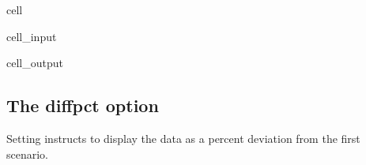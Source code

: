\documentclass[letterpaper,10pt,english]{jupyterBook}
\begin{document}
\begin{sphinxuseclass}{cell}\begin{sphinxVerbatimInput}

\begin{sphinxuseclass}{cell_input}
\begin{sphinxVerbatim}[commandchars=\\\{\}]
  
\end{sphinxVerbatim}

\end{sphinxuseclass}\end{sphinxVerbatimInput}
\begin{sphinxVerbatimOutput}

\begin{sphinxuseclass}{cell_output}
\noindent{}

\noindent{}

\end{sphinxuseclass}\end{sphinxVerbatimOutput}

\end{sphinxuseclass}

\subsection{The diffpct option}
\label{\detokenize{content/05_WBModels/ScenarioAnalysis:the-diffpct-option}}
\sphinxAtStartPar
Setting  instructs  to display the data as a percent deviation from the first  scenario.
\end{document}
